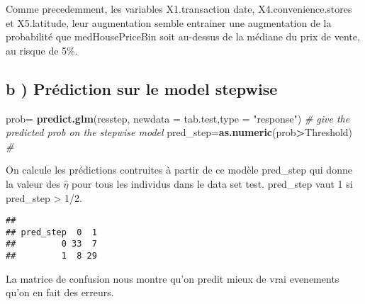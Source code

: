 \documentclass[
]{article}
\newenvironment{Shaded}{\begin{snugshade}}{\end{snugshade}}
\newcommand{\CommentTok}[1]{\textcolor[rgb]{0.56,0.35,0.01}{\textit{#1}}}
\newcommand{\DataTypeTok}[1]{\textcolor[rgb]{0.13,0.29,0.53}{#1}}
\newcommand{\KeywordTok}[1]{\textcolor[rgb]{0.13,0.29,0.53}{\textbf{#1}}}
\newcommand{\NormalTok}[1]{#1}
\newcommand{\OperatorTok}[1]{\textcolor[rgb]{0.81,0.36,0.00}{\textbf{#1}}}
\newcommand{\StringTok}[1]{\textcolor[rgb]{0.31,0.60,0.02}{#1}}
\begin{document}
Comme precedemment, les variables X1.transaction date,
X4.convenience.stores et X5.latitude, leur augmentation semble entrainer
une augmentation de la probabilité que medHousePriceBin soit au-dessus
de la médiane du prix de vente, au risque de 5\%.

\hypertarget{b-pruxe9diction-sur-le-model-stepwise}{%
\subsection{b ) Prédiction sur le model
stepwise}\label{b-pruxe9diction-sur-le-model-stepwise}}

\begin{Shaded}
\begin{Highlighting}[]
\NormalTok{prob=}\StringTok{ }\KeywordTok{predict.glm}\NormalTok{(resstep, }\DataTypeTok{newdata =}\NormalTok{ tab.test,}\DataTypeTok{type =} \StringTok{"response"}\NormalTok{) }\CommentTok{# give the predicted prob on the stepwise model}
\NormalTok{pred_step=}\KeywordTok{as.numeric}\NormalTok{(prob}\OperatorTok{>}\NormalTok{Threshold) }\CommentTok{#}
\end{Highlighting}
\end{Shaded}

On calcule les prédictions contruites à partir de ce modèle pred\_step
qui donne la valeur des \(\hat\eta\) pour tous les individus dans le
data set test. pred\_step vaut 1 si pred\_step \textgreater{} 1/2.

\begin{Shaded}
\end{Shaded}

\begin{verbatim}
##          
## pred_step  0  1
##         0 33  7
##         1  8 29
\end{verbatim}

La matrice de confusion nous montre qu'on predit mieux de vrai
evenements qu'on en fait des erreurs.
\end{document}
